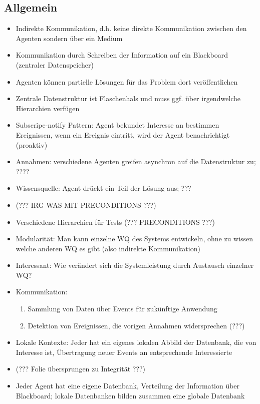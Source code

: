 \documentclass{article} %
\begin{document}
	\subsection{Allgemein}
	\begin{itemize}
		\item Indirekte Kommunikation, d.h. keine direkte Kommunikation zwischen den Agenten sondern über ein Medium
		\item Kommunikation durch Schreiben der Information auf ein Blackboard (zentraler Datenspeicher)
		\item Agenten können partielle Lösungen für das Problem dort veröffentlichen
		\item Zentrale Datenstruktur ist Flaschenhals und muss ggf. über irgendwelche Hierarchien verfügen
		\item Subscripe-notify Pattern: Agent bekundet Interesse an  bestimmen Ereignissen, wenn ein Ereignis eintritt, wird der Agent benachrichtigt (proaktiv)
		\item Annahmen: verschiedene Agenten greifen asynchron auf die Datenstruktur zu; ????
		\item Wissensquelle: Agent drückt ein Teil der Lösung aus; ???
		\item (??? IRG WAS MIT PRECONDITIONS ???)
		\item Verschiedene Hierarchien für Tests (??? PRECONDITIONS ???)
		\item Modularität: Man kann einzelne WQ des Systems entwickeln, ohne zu wissen welche anderen WQ es gibt (also indirekte Kommunikation)
		\item Interessant: Wie verändert sich die Systemleistung durch Austausch einzelner WQ?
		\item Kommunikation:
		\begin{enumerate}
			\item Sammlung von Daten über Events für zukünftige Anwendung
			\item Detektion von Ereignissen, die vorigen Annahmen widersprechen (???)
		\end{enumerate}
		\item Lokale Kontexte: Jeder hat ein eigenes lokalen Abbild der Datenbank, die von Interesse ist, Übertragung neuer Events an entsprechende Interessierte
		\item (??? Folie übersprungen zu Integrität ???)
		\item Jeder Agent hat eine eigene Datenbank, Verteilung der Information über Blackboard; lokale Datenbanken bilden zusammen eine globale Datenbank
	\end{itemize}
\end{document}
